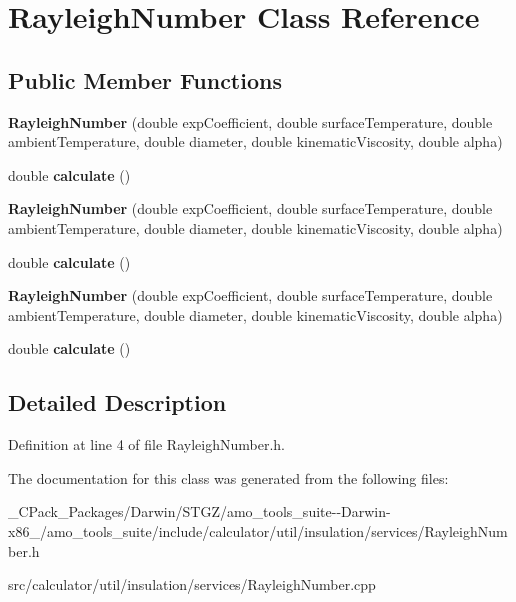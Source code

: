\hypertarget{class_rayleigh_number}{}\section{Rayleigh\+Number Class Reference}
\label{class_rayleigh_number}
\subsection*{Public Member Functions}
\begin{DoxyCompactItemize}
\item 
\mbox{\label{class_rayleigh_number_a687ffee8fced1220b91a9737a7335cd6}} 
{\bfseries Rayleigh\+Number} (double exp\+Coefficient, double surface\+Temperature, double ambient\+Temperature, double diameter, double kinematic\+Viscosity, double alpha)
\item 
\mbox{\label{class_rayleigh_number_a6bff54559f50c69c3329e503f24fac00}} 
double {\bfseries calculate} ()
\item 
\mbox{\label{class_rayleigh_number_a687ffee8fced1220b91a9737a7335cd6}} 
{\bfseries Rayleigh\+Number} (double exp\+Coefficient, double surface\+Temperature, double ambient\+Temperature, double diameter, double kinematic\+Viscosity, double alpha)
\item 
\mbox{\label{class_rayleigh_number_a6bff54559f50c69c3329e503f24fac00}} 
double {\bfseries calculate} ()
\item 
\mbox{\label{class_rayleigh_number_a687ffee8fced1220b91a9737a7335cd6}} 
{\bfseries Rayleigh\+Number} (double exp\+Coefficient, double surface\+Temperature, double ambient\+Temperature, double diameter, double kinematic\+Viscosity, double alpha)
\item 
\mbox{\label{class_rayleigh_number_a6bff54559f50c69c3329e503f24fac00}} 
double {\bfseries calculate} ()
\end{DoxyCompactItemize}


\subsection{Detailed Description}


Definition at line 4 of file Rayleigh\+Number.\+h.



The documentation for this class was generated from the following files\+:\begin{DoxyCompactItemize}
\item 
\+\_\+\+C\+Pack\+\_\+\+Packages/\+Darwin/\+S\+T\+G\+Z/amo\+\_\+tools\+\_\+suite-\/-\/\+Darwin-\/x86\+\_/amo\+\_\+tools\+\_\+suite/include/calculator/util/insulation/services/Rayleigh\+Number.\+h\item 
src/calculator/util/insulation/services/Rayleigh\+Number.\+cpp\end{DoxyCompactItemize}
